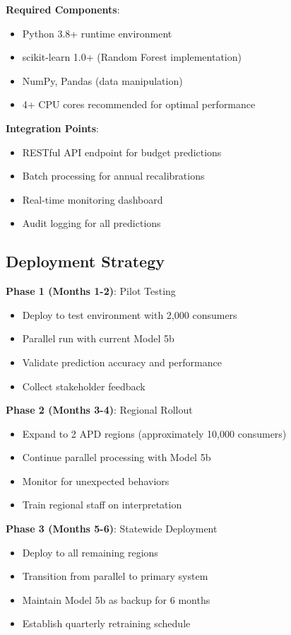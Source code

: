 \textbf{Required Components}:
\begin{itemize}
    \item Python 3.8+ runtime environment
    \item scikit-learn 1.0+ (Random Forest implementation)
    \item NumPy, Pandas (data manipulation)
    \item 4+ CPU cores recommended for optimal performance
\end{itemize}

\textbf{Integration Points}:
\begin{itemize}
    \item RESTful API endpoint for budget predictions
    \item Batch processing for annual recalibrations
    \item Real-time monitoring dashboard
    \item Audit logging for all predictions
\end{itemize}

\subsection{Deployment Strategy}

\textbf{Phase 1 (Months 1-2)}: Pilot Testing
\begin{itemize}
    \item Deploy to test environment with 2,000 consumers
    \item Parallel run with current Model 5b
    \item Validate prediction accuracy and performance
    \item Collect stakeholder feedback
\end{itemize}

\textbf{Phase 2 (Months 3-4)}: Regional Rollout
\begin{itemize}
    \item Expand to 2 APD regions (approximately 10,000 consumers)
    \item Continue parallel processing with Model 5b
    \item Monitor for unexpected behaviors
    \item Train regional staff on interpretation
\end{itemize}

\textbf{Phase 3 (Months 5-6)}: Statewide Deployment
\begin{itemize}
    \item Deploy to all remaining regions
    \item Transition from parallel to primary system
    \item Maintain Model 5b as backup for 6 months
    \item Establish quarterly retraining schedule
\end{itemize}

